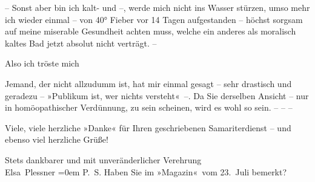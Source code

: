 \pstart
           – Sonst aber bin ich kalt- und \label{K_L03715-5v}\label{K_L03715-5} –, werde mich nicht ins Wasser stürzen,
               umso mehr ich wieder einmal – von 40° Fieber vor 14 Tagen aufgestanden –
               höchst sorgsam auf meine miserable Gesundheit achten muss, welche ein anderes als
               moralisch kaltes Bad jetzt absolut nicht verträgt. –\pend
           
\pstart
           {\pb}Also ich tröste mich{\dotsfour}\pend
           
\pstart
           Jemand, der nicht allzudumm ist, hat \introOben{}mir\introOben{} einmal gesagt –
               sehr drastisch und geradezu – »Publikum ist, wer nichts versteht« –. Da Sie derselben
               Ansicht – nur in homöopathischer Verdünnung, zu sein scheinen, wird es wohl so sein.
               – – –\pend
           
\pstart
           Viele, viele herzliche »Danke« für Ihren geschriebenen Samariterdienst – und ebenso
               viel herzliche Grüße!\pend
           
\pstart
           Stets dankbarer und mit unveränderlicher Verehrung{\\[\baselineskip]}\spacefill\mbox{Elsa Plessner}\pend
           \leftskip=0em{}
\pstart
           \noindent{}P. S. Haben Sie \label{K_L03715-6v}\label{K_L03715-6} im »Magazin« vom 23. Juli bemerkt?\pend
           \endnumbering{}  \newcommand{\dateiname}{L03715}\newcommand{\titel}{Elsa Plessner an Arthur Schnitzler, 9. 8. 1897}\newcommand{\editorInnen}{Selma Jahnke und Martin Anton Müller}
